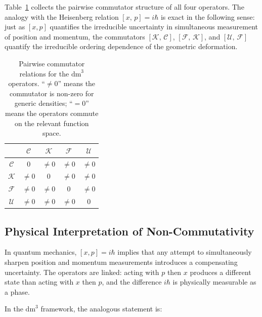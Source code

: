 \documentclass[11pt,a4paper,openright]{book}
\theoremstyle{dm3thm}
\theoremstyle{dm3def}
\newcommand{\dm}{\mathrm{dm}^3}
\newcommand{\comm}[2]{[#1,\,#2]}
\newcommand{\UU}{\mathcal{U}}
\newcommand{\FF}{\mathcal{F}}
\newcommand{\KK}{\mathcal{K}}
\newcommand{\CC}{\mathcal{C}}
\begin{document}
Table~\ref{tab:comm} collects the pairwise commutator structure of all four
operators.  The analogy with the Heisenberg relation $\comm{x}{p}=i\hbar$ is
exact in the following sense: just as $[x,p]$ quantifies the irreducible
uncertainty in simultaneous measurement of position and momentum, the
commutators $\comm{\KK}{\CC}$, $\comm{\FF}{\KK}$, and $\comm{\UU}{\FF}$
quantify the irreducible ordering dependence of the geometric deformation.

\begin{table}[h]
\centering
\caption{Pairwise commutator relations for the $\dm$ operators.
``$\neq 0$'' means the commutator is non-zero for generic densities;
``$= 0$'' means the operators commute on the relevant function space.}
\label{tab:comm}
\begin{tabular}{ccccc}
\toprule
         & $\CC$ & $\KK$ & $\FF$ & $\UU$ \\
\midrule
$\CC$    & $0$   & $\neq 0$ & $\neq 0$ & $\neq 0$ \\
$\KK$    & $\neq 0$ & $0$ & $\neq 0$ & $\neq 0$ \\
$\FF$    & $\neq 0$ & $\neq 0$ & $0$ & $\neq 0$ \\
$\UU$    & $\neq 0$ & $\neq 0$ & $\neq 0$ & $0$ \\
\bottomrule
\end{tabular}
\end{table}

\subsection{Physical Interpretation of Non-Commutativity}
\label{ssec:physcomm}

In quantum mechanics, $[x,p]=i\hbar$ implies that any attempt to simultaneously
sharpen position and momentum measurements introduces a compensating uncertainty.
The operators are linked: acting with $p$ then $x$ produces a different state
than acting with $x$ then $p$, and the difference $i\hbar$ is physically
measurable as a phase.

In the $\dm$ framework, the analogous statement is:
\end{document}
